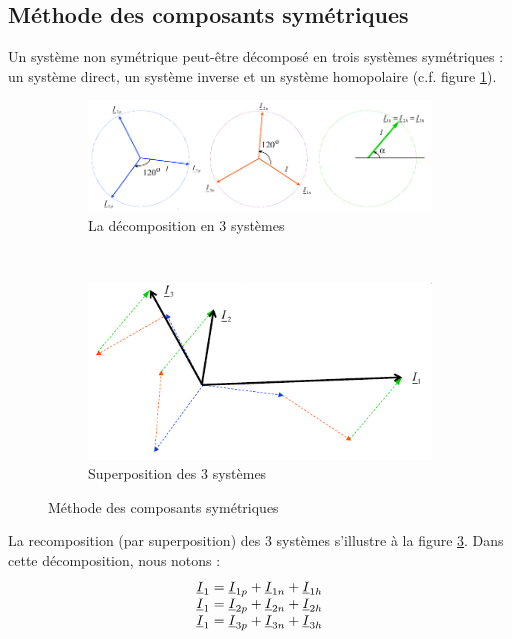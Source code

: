 \documentclass[12pt,a4paper]{article}
\newcommand{\ui}{\uline{I} }
\begin{document}
\subsection{Méthode des composants symétriques}
Un système non symétrique peut-être décomposé en trois systèmes symétriques : un système direct, un système inverse et un système homopolaire (c.f. figure \ref{subfig: methode composants symetriques}). 
\begin{figure}
	\begin{subfigure}[b]{0.9\textwidth}
		\centering	
		\includegraphics[scale=0.6]{images/methode_composant_sym2}
		\caption{La décomposition en 3 systèmes}
		\label{subfig: methode composants symetriques}
	\end{subfigure}\\
	\begin{subfigure}[b]{0.9\textwidth}
		\centering
		\includegraphics[scale=0.6]{images/methode_composant_sym}
		\caption{Superposition des 3 systèmes}
		\label{subfig: methode composants symetriques2}
	\end{subfigure}
	\caption{Méthode des composants symétriques}
\end{figure}
La recomposition (par superposition) des 3 systèmes s'illustre à la figure \ref{subfig: methode composants symetriques2}. Dans cette décomposition, nous notons :
\[\begin{array}{l}
	\ui_1 = \ui_{1p} + \ui_{1n} + \ui_{1h}\\
	\ui_1 = \ui_{2p} + \ui_{2n} + \ui_{2h}\\
	\ui_1 = \ui_{3p} + \ui_{3n} + \ui_{3h}
\end{array}\]
\end{document}

